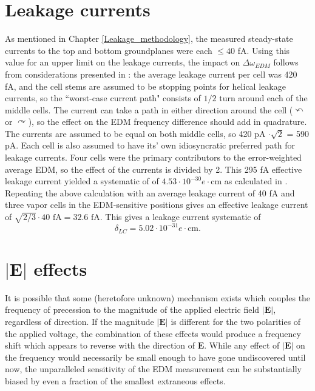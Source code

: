 \documentclass [10pt, twoside] {uwthesis}[2012/04/02]
\begin{document}
\section{Leakage currents} \label{leakage_systematic}
As mentioned in Chapter \ref{Leakage_methodology}, the measured steady-state currents to the top and bottom groundplanes were each $\le 40$ fA. Using this value for an upper limit on the leakage currents, the impact on $\Delta\omega_{EDM}$ follows from considerations presented in \cite{2009_Hg_EDM}: the average leakage current per cell was 420 fA, and the cell stems are assumed to be stopping points for helical leakage currents, so the ``worst-case current path" consists of $1/2$ turn around each of the middle cells. The current can take a path in either direction around the cell ($\curvearrowleft$ or $\curvearrowright$), so the effect on the EDM frequency difference should add in quadrature. The currents are assumed to be equal on both middle cells, so 420 pA $\cdot \sqrt{2}$ = 590 pA. Each cell is also assumed to have its' own idiosyncratic preferred path for leakage currents. Four cells were the primary contributors to the error-weighted average EDM, so the effect of the currents is divided by 2. This 295 fA effective leakage current yielded a systematic of of $4.53\cdot10^{-30} e\cdot \text{cm}$ as calculated in \cite{2013_Hg_EDM_PRA}. Repeating the above calculation with an average leakage current of 40 fA and three vapor cells in the EDM-sensitive positions gives an effective leakage current of $\sqrt{2/3}\cdot\text{40 fA} = \text{32.6 fA}$. This gives a leakage current systematic of 
\begin{equation}
\delta_{LC} = 5.02 \cdot 10^{-31} e\cdot \text{cm}.
\end{equation}

\section{$|\mathbf{E}|$ effects} \label{|E|_effects}
It is possible that some (heretofore unknown) mechanism exists which couples the frequency of precession to the magnitude of the applied electric field $|\mathbf{E}|$, regardless of direction. If the magnitude $|\mathbf{E}|$ is different for the two polarities of the applied voltage, the combination of these effects would produce a frequency shift which appears to reverse with the direction of $\mathbf{E}$. While any effect of $|\mathbf{E}|$ on the frequency would necessarily be small enough to have gone undiscovered until now, the unparalleled sensitivity of the EDM measurement can be substantially biased by even a fraction of the smallest extraneous effects. 
\end{document}
